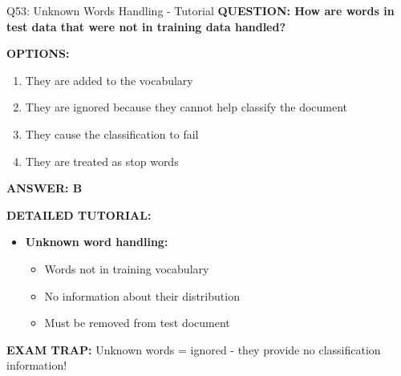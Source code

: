 \documentclass[8pt]{beamer}
\begin{document}
	\begin{frame}{Q53: Unknown Words Handling - Tutorial}
		\fontsize{6.5}{7.5}\selectfont
		\textbf{QUESTION: How are words in test data that were not in training data handled?}
		
		\vspace{0.1cm}
		\textbf{OPTIONS:}
		\begin{enumerate}
			\item They are added to the vocabulary
			\item They are ignored because they cannot help classify the document
			\item They cause the classification to fail
			\item They are treated as stop words
		\end{enumerate}
		
		\vspace{0.1cm}
		\textcolor{myblue}{\textbf{ANSWER: B}}
		
		\vspace{0.1cm}
		\textbf{DETAILED TUTORIAL:}
		\begin{itemize}
			\item \textbf{Unknown word handling:}
			\begin{itemize}
				\item Words not in training vocabulary
				\item No information about their distribution
				\item Must be removed from test document
			\end{itemize}
		\end{itemize}
		
		\textcolor{myred}{\textbf{EXAM TRAP:}} Unknown words = \textcolor{myblue}{ignored} - they provide no classification information!
	\end{frame}
	
\end{document}
